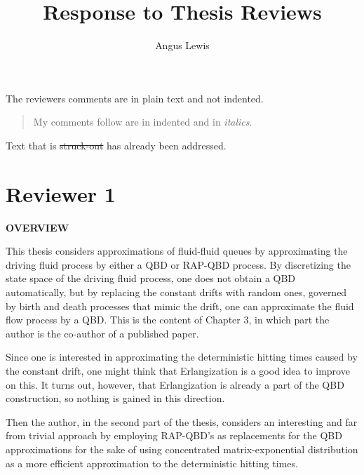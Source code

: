 \documentclass[a4paper]{article}
\title{Response to Thesis Reviews}
\author{Angus Lewis}
\begin{document}
\maketitle
The reviewers comments are in plain text and not indented. 
\begin{quote}
    My comments follow are in indented and in \emph{italics}. 
\end{quote}
Text that is \st{struck-out} has already been addressed.

\pagebreak
\section{Reviewer 1}

\noindent\textbf{OVERVIEW} 

This thesis considers approximations of fluid-fluid queues by approximating the driving fluid process by either a QBD or RAP-QBD process. By discretizing the state space of the driving fluid process, one does not obtain a QBD automatically, but by
replacing the constant drifts with random ones, governed by birth and death processes that mimic the drift, one can approximate the fluid flow process by a QBD.
This is the content of Chapter 3, in which part the author is the co-author of a
published paper.

Since one is interested in approximating the deterministic hitting times caused by
the constant drift, one might think that Erlangization is a good idea to improve on
this. It turns out, however, that Erlangization is already a part of the QBD construction, so nothing is gained in this direction.

Then the author, in the second part of the thesis, considers an interesting and far
from trivial approach by employing RAP-QBD's as replacements for the QBD approximations for the sake of using concentrated matrix-exponential distribution as a
more efficient approximation to the deterministic hitting times.
\end{document}
